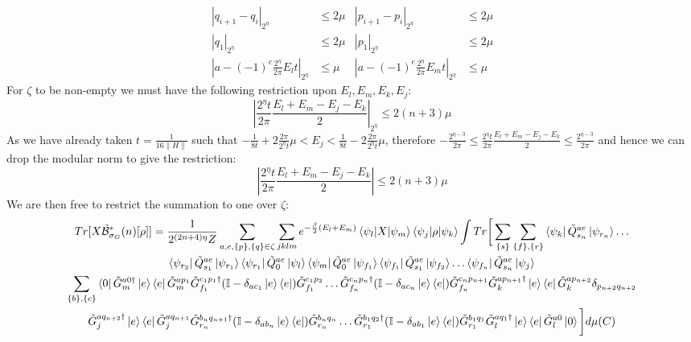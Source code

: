 \documentclass[aps,floatfix,10pt,amssymb,amsfont,amsmath,superscriptaddress,float,nofootinbib,longbibliography,nobalancelastpage,twocolumn]{revtex4-2}
\begin{document}
\begin{widetext}
\begin{equation}
\begin{aligned}
    |q_{i+1}-q_i|_{2^{\eta}} &\leq 2\mu  &|p_{i+1}-p_i|_{2^{\eta}} &\leq 2\mu\\
    |q_1|_{2^{\eta}} &\leq 2\mu  &|p_1|_{2^{\eta}}&\leq 2\mu\\
    |a-(-1)^{e}\frac{2^{\eta}}{2\pi}E_lt|_{2^{\eta}} &\leq \mu   &|a-(-1)^{e}\frac{2^{\eta}}{2\pi}E_mt|_{2^{\eta}}& \leq \mu
\end{aligned}
\end{equation}
For $\zeta$ to be non-empty we must have the following restriction upon $E_l,E_m,E_k, E_j$:
\begin{equation}
    \left|\frac{2^{\eta}t}{2\pi}\frac{E_l+E_m-E_j-E_k}{2}\right|_{2^{\eta}} \leq 2(n+3)\mu
\end{equation}
As we have already taken $t= \frac{1}{16\|H\|}$ such that $-\frac{1}{8t} + 2\frac{2\pi}{2^{\eta}t}\mu < E_j < \frac{1}{8t} - 2\frac{2\pi}{2^{\eta}t}\mu$, therefore $-\frac{2^{\eta-3}}{2\pi}\leq \frac{2^{\eta}t}{2\pi}\frac{E_l+E_m-E_j-E_k}{2} \leq \frac{2^{\eta-3}}{2\pi}$ and hence we can drop the modular norm to give the restriction:
\begin{equation}
\label{eq:energiessame}
    \left|\frac{2^{\eta}t}{2\pi}\frac{E_l+E_m-E_j-E_k}{2}\right| \leq 2(n+3)\mu
\end{equation}
We are then free to restrict the summation to one over $\zeta$:
\begin{multline}
    Tr[X\tilde{\mathcal{B}}^*_{\sigma_G}(n)[\rho]] = \frac{1}{2^{(2n+4)\eta}Z}\sum_{a,e, \{p\}, \{q\}\in \zeta}
    \sum_{jklm}e^{-\frac{\beta}{2}(E_l+E_m)}\braket{\psi_l|X|\psi_m}\braket{\psi_j|\rho|\psi_k}\int Tr\bigg[ \sum_{\{s\}}\sum_{\{f\}, \{r\}}\bra{\psi_k}\tilde Q^{ae}_{s_n}\ket{\psi_{r_{n}}}\ldots \\\bra{\psi_{r_2}}\tilde Q^{ae}_{s_1}\ket{\psi_{r_1}}\bra{\psi_{r_1}}\tilde Q^{ae}_0\ket{\psi_l}
\bra{\psi_m}\tilde Q^{ae}_0\ket{\psi_{f_1}}\bra{\psi_{f_1}}\tilde Q^{ae}_{s_1}\ket{\psi_{f_2}}\ldots \bra{\psi_{f_{n}}}\tilde Q^{ae}_{s_n}\ket{\psi_j}\\
\sum_{\{b\}, \{c\}}
\bra{0}\tilde G^{a0\dagger}_m\ket{e}\bra{e}\tilde G^{ap_1}_m\tilde G^{c_1p_1\dagger}_{f_1}(\mathbb{I} - \delta_{ac_1}\ket{e}\bra{e})\tilde G^{c_1p_2}_{f_1}\ldots \tilde G^{c_np_n\dagger}_{f_n}(\mathbb{I} - \delta_{ac_n}\ket{e}\bra{e})\tilde G^{c_np_{n+1}}_{f_n}\tilde G^{ap_{n+1}\dagger}_{k}\ket{e}\bra{e}\tilde G^{ap_{n+2}}_k \delta_{p_{n+2}q_{n+2}}\\\tilde G^{aq_{n+2}\dagger}_j \ket{e}\bra{e}\tilde G^{aq_{n+1}}_j \tilde G^{b_{n}q_{n+1}\dagger}_{r_n}(\mathbb{I} - \delta_{ab_n}\ket{e}\bra{e})\tilde G^{b_nq_n}_{r_n}\ldots \tilde G^{b_1q_2\dagger}_{r_1}(\mathbb{I} - \delta_{ab_1}\ket{e}\bra{e})\tilde G^{b_1q_1}_{r_1}\tilde G^{aq_1\dagger}_l\ket{e}\bra{e}\tilde G^{a0}_l\ket{0}\bigg]d\mu(C)

\end{multline}
\end{widetext}
\end{document}
